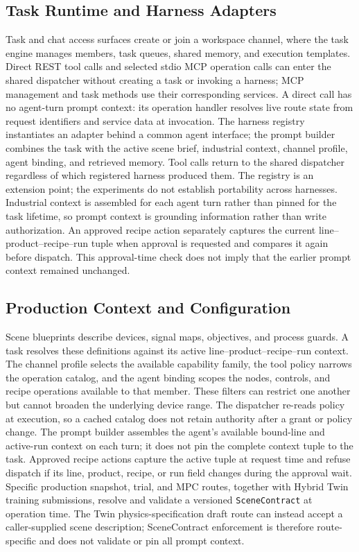 \subsection{Task Runtime and Harness Adapters}
Task and chat access surfaces create or join a workspace channel, where the
task engine manages members, task queues, shared memory, and execution
templates. Direct REST tool calls and selected stdio MCP operation calls can
enter the shared dispatcher without creating a task or invoking a harness;
MCP management and task methods use their corresponding services. A direct
call has no agent-turn prompt context: its operation handler resolves live
route state from request identifiers and service data at invocation.
The harness registry instantiates an adapter behind a common agent interface;
the prompt builder combines the task with the active scene brief, industrial
context, channel profile, agent binding, and retrieved memory. Tool calls
return to the shared dispatcher regardless of which registered harness
produced them. The registry is an extension point; the experiments do not
establish portability across harnesses. Industrial context is assembled for
each agent turn rather than pinned for the task lifetime, so prompt context is
grounding information rather than write authorization. An approved recipe
action separately captures the current line--product--recipe--run tuple when
approval is requested and compares it again before dispatch. This
approval-time check does not imply that the earlier prompt context remained
unchanged.

\subsection{Production Context and Configuration}
Scene blueprints describe devices, signal maps, objectives, and process
guards. A task resolves these definitions against its active
line--product--recipe--run context. The channel profile selects the available
capability family, the tool policy narrows the operation catalog, and the
agent binding scopes the nodes, controls, and recipe operations available to
that member. These filters can restrict one another but cannot broaden the
underlying device range. The dispatcher re-reads policy at execution, so a
cached catalog does not retain authority after a grant or policy change. The
prompt builder assembles the agent's available bound-line and active-run
context on each turn; it does not pin the complete context tuple to the task.
Approved recipe actions capture the active tuple at request time and refuse
dispatch if its line, product, recipe, or run field changes during the
approval wait.
Specific production snapshot, trial, and MPC routes, together with Hybrid Twin
training submissions, resolve and validate a versioned \texttt{SceneContract}
at operation time. The Twin physics-specification draft route can instead
accept a caller-supplied scene description; SceneContract enforcement is
therefore route-specific and does not validate or pin all prompt context.

